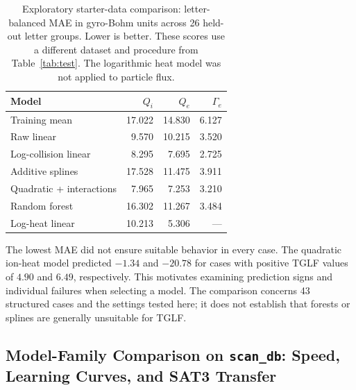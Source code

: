 \documentclass[12pt,letterpaper]{article}
\begin{document}
\begin{table}[htbp]
  \centering
  \caption{Exploratory starter-data comparison: letter-balanced MAE in
    gyro-Bohm units across 26 held-out letter groups. Lower is better.
    These scores use a different dataset and procedure from Table~\ref{tab:test}.
    The logarithmic heat model was not applied to particle flux.}
  \label{tab:starter}
  \small
  \begin{tabular}{lrrr}
    \toprule
    Model                    & $Q_i$  & $Q_e$  & $\Gamma_e$ \\
    \midrule
    Training mean            & 17.022 & 14.830 & 6.127      \\
    Raw linear               & 9.570  & 10.215 & 3.520      \\
    Log-collision linear     & 8.295  & 7.695  & 2.725      \\
    Additive splines         & 17.528 & 11.475 & 3.911      \\
    Quadratic + interactions & 7.965  & 7.253  & 3.210      \\
    Random forest            & 16.302 & 11.267 & 3.484      \\
    Log-heat linear          & 10.213 & 5.306  & ---        \\
    \bottomrule
  \end{tabular}
\end{table}

The lowest MAE did not ensure suitable behavior in every case. The quadratic
ion-heat model predicted $-1.34$ and $-20.78$ for cases with positive TGLF
values of $4.90$ and $6.49$, respectively. This motivates examining prediction
signs and individual failures when selecting a model. The comparison concerns
43 structured cases and the settings tested here; it does not establish that
forests or splines are generally unsuitable for TGLF.

\subsection{Model-Family Comparison on \texttt{scan\_db}: Speed, Learning Curves, and SAT3 Transfer}
\label{sec:modelfamily-results}
\end{document}

